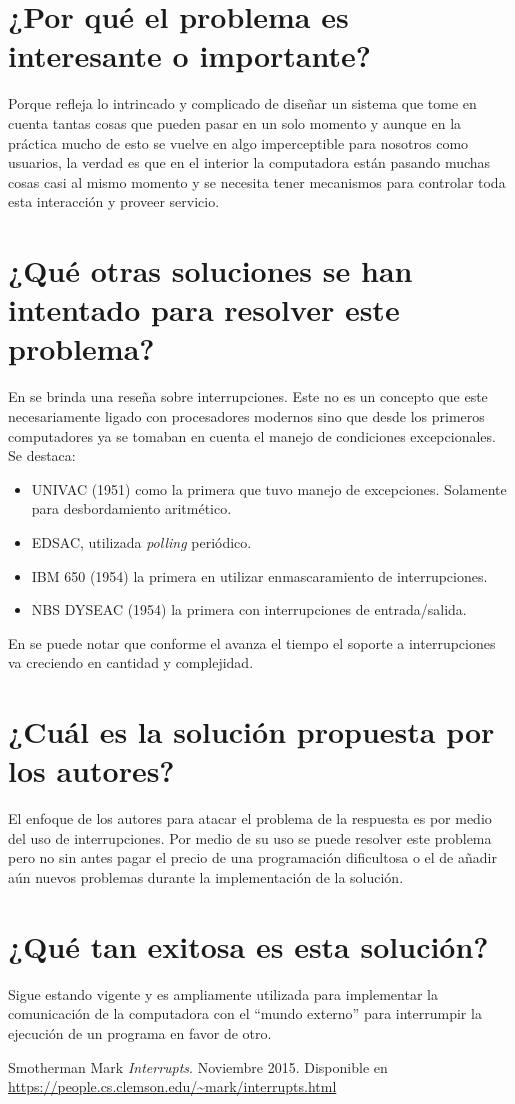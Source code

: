 \section{¿Por qué el problema es interesante o importante?}
Porque refleja lo intrincado y complicado de diseñar un sistema que tome en cuenta tantas cosas que pueden pasar en un solo momento y aunque en la práctica mucho de esto se vuelve en algo imperceptible para nosotros como usuarios, la verdad es que en el interior la computadora están pasando muchas cosas casi al mismo momento y se necesita tener mecanismos para controlar toda esta interacción y proveer servicio.


\section{¿Qué otras soluciones se han intentado para resolver este problema?}
En \cite{mark-smotherman} se brinda una reseña sobre interrupciones. Este no es un concepto que este necesariamente ligado con procesadores modernos sino que desde los primeros computadores ya se tomaban en cuenta el manejo de condiciones excepcionales. Se destaca:
\begin{itemize}
    \item UNIVAC (1951) como la primera que tuvo manejo de excepciones. Solamente para desbordamiento aritmético.
    \item EDSAC, utilizada \textit{polling} periódico.
    \item IBM 650 (1954) la primera en utilizar enmascaramiento de interrupciones.
    \item NBS DYSEAC (1954) la primera con interrupciones de entrada/salida.
\end{itemize}

En \cite{mark-smotherman} se puede notar que conforme el avanza el tiempo el soporte a interrupciones va creciendo en cantidad y complejidad.

     
\section{¿Cuál es la solución propuesta por los autores?}
El enfoque de los autores para atacar el problema de la respuesta es por medio del uso de interrupciones. Por medio de su uso se puede resolver este problema pero no sin antes pagar el precio de una programación dificultosa o el de añadir aún nuevos problemas durante la implementación de la solución.


\section{¿Qué tan exitosa es esta solución?}
Sigue estando vigente y es ampliamente utilizada para implementar la comunicación de la computadora con el ``mundo externo'' para interrumpir la ejecución de un programa en favor de otro. 
 



\begin{thebibliography}{9}

 Smotherman Mark \emph{Interrupts}. Noviembre 2015. Disponible en \url{https://people.cs.clemson.edu/~mark/interrupts.html}

\end{thebibliography}